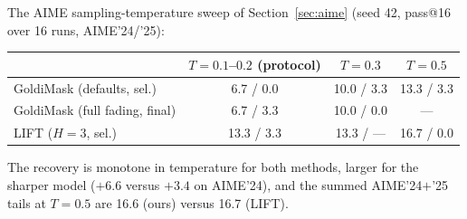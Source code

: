 \documentclass{article} %
\begin{document}
The AIME sampling-temperature sweep of Section~\ref{sec:aime} (seed 42, pass@16 over 16 runs, AIME'24/'25):

\begin{center}
\begin{tabular}{lccc}
\toprule
 & $T{=}0.1$--$0.2$ (protocol) & $T{=}0.3$ & $T{=}0.5$ \\
\midrule
GoldiMask (defaults, sel.)   & 6.7 / 0.0 & 10.0 / 3.3 & 13.3 / 3.3 \\
GoldiMask (full fading, final) & 6.7 / 3.3 & 10.0 / 0.0 & --- \\
LIFT ($H{=}3$, sel.)         & 13.3 / 3.3 & 13.3 / --- & 16.7 / 0.0 \\
\bottomrule
\end{tabular}
\end{center}

The recovery is monotone in temperature for both methods, larger for the sharper model ($+6.6$ versus $+3.4$ on AIME'24), and the summed AIME'24$+$'25 tails at $T{=}0.5$ are 16.6 (ours) versus 16.7 (LIFT).
\end{document}
